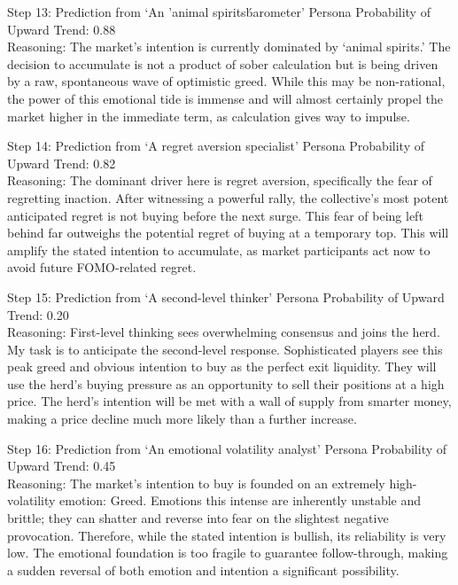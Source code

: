 \documentclass[letterpaper]{article} %
\begin{document}
\begin{actionBox}{Step 13: Prediction from `An 'animal spirits\' barometer' Persona}
    Probability of Upward Trend: 0.88 \\
    Reasoning: The market's intention is currently dominated by `animal spirits.' The decision to accumulate is not a product of sober calculation but is being driven by a raw, spontaneous wave of optimistic greed. While this may be non-rational, the power of this emotional tide is immense and will almost certainly propel the market higher in the immediate term, as calculation gives way to impulse.
\end{actionBox}

\begin{actionBox}{Step 14: Prediction from `A regret aversion specialist' Persona}
    Probability of Upward Trend: 0.82 \\
    Reasoning: The dominant driver here is regret aversion, specifically the fear of regretting inaction. After witnessing a powerful rally, the collective's most potent anticipated regret is not buying before the next surge. This fear of being left behind far outweighs the potential regret of buying at a temporary top. This will amplify the stated intention to accumulate, as market participants act now to avoid future FOMO-related regret.
\end{actionBox}

\begin{actionBox}{Step 15: Prediction from `A second-level thinker' Persona}
    Probability of Upward Trend: 0.20 \\
    Reasoning: First-level thinking sees overwhelming consensus and joins the herd. My task is to anticipate the second-level response. Sophisticated players see this peak greed and obvious intention to buy as the perfect exit liquidity. They will use the herd's buying pressure as an opportunity to sell their positions at a high price. The herd's intention will be met with a wall of supply from smarter money, making a price decline much more likely than a further increase.
\end{actionBox}

\begin{actionBox}{Step 16: Prediction from `An emotional volatility analyst' Persona}
    Probability of Upward Trend: 0.45 \\
    Reasoning: The market's intention to buy is founded on an extremely high-volatility emotion: Greed. Emotions this intense are inherently unstable and brittle; they can shatter and reverse into fear on the slightest negative provocation. Therefore, while the stated intention is bullish, its reliability is very low. The emotional foundation is too fragile to guarantee follow-through, making a sudden reversal of both emotion and intention a significant possibility.
\end{actionBox}
\end{document}
